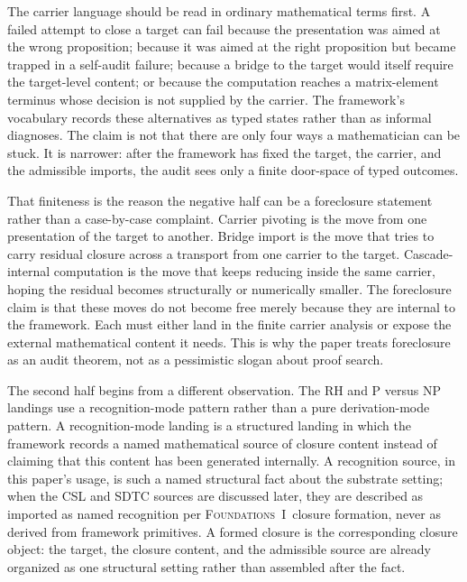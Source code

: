 \documentclass[11pt]{article}
\newcommand{\FOne}{\textsc{Foundations~I}}
\theoremstyle{definition}
\begin{document}
The carrier language should be read in ordinary mathematical terms
first.  A failed attempt to close a target can fail because the
presentation was aimed at the wrong proposition; because it was aimed
at the right proposition but became trapped in a self-audit failure;
because a bridge to the target would itself require the target-level
content; or because the computation reaches a matrix-element terminus
whose decision is not supplied by the carrier.  The framework's
vocabulary records these alternatives as typed states rather than as
informal diagnoses.  The claim is not that there are only four ways a
mathematician can be stuck.  It is narrower: after the framework has
fixed the target, the carrier, and the admissible imports, the audit
sees only a finite door-space of typed outcomes.

That finiteness is the reason the negative half can be a foreclosure
statement rather than a case-by-case complaint.  Carrier pivoting is
the move from one presentation of the target to another.  Bridge
import is the move that tries to carry residual closure across a
transport from one carrier to the target.  Cascade-internal
computation is the move that keeps reducing inside the same carrier,
hoping the residual becomes structurally or numerically smaller.  The
foreclosure claim is that these moves do not become free merely
because they are internal to the framework.  Each must either land in
the finite carrier analysis or expose the external mathematical
content it needs.  This is why the paper treats foreclosure as an
audit theorem, not as a pessimistic slogan about proof search.

The second half begins from a different observation.  The RH and
P versus NP landings use a recognition-mode pattern rather than a
pure derivation-mode pattern.  A recognition-mode landing is a
structured landing in which the framework records a named
mathematical source of closure content instead of claiming that this
content has been generated internally.  A recognition source, in this
paper's usage, is such a named structural fact about the substrate
setting; when the CSL and SDTC sources are discussed later, they are
described as imported as named recognition per \FOne\ closure
formation, never as derived from framework primitives.  A formed
closure is the corresponding closure object: the target, the closure
content, and the admissible source are already organized as one
structural setting rather than assembled after the fact.
\end{document}
